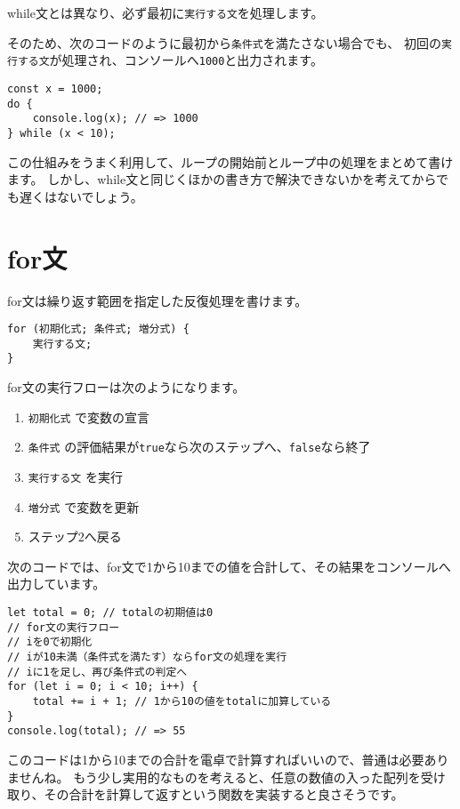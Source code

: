while文とは異なり、必ず最初に\texttt{実行する文}を処理します。

そのため、次のコードのように最初から\texttt{条件式}を満たさない場合でも、
初回の\texttt{実行する文}が処理され、コンソールへ\texttt{1000}と出力されます。

\begin{lstlisting}
const x = 1000;
do {
    console.log(x); // => 1000
} while (x < 10);
\end{lstlisting}

この仕組みをうまく利用して、ループの開始前とループ中の処理をまとめて書けます。
しかし、while文と同じくほかの書き方で解決できないかを考えてからでも遅くはないでしょう。

\hypertarget{for-statement}{%
\section{for文}\label{for-statement}}

for文は繰り返す範囲を指定した反復処理を書けます。

\begin{lstlisting}
for (初期化式; 条件式; 増分式) {
    実行する文;
}
\end{lstlisting}

for文の実行フローは次のようになります。

\begin{enumerate}
\def\labelenumi{\arabic{enumi}.}
\item
  \texttt{初期化式} で変数の宣言
\item
  \texttt{条件式}
  の評価結果が\texttt{true}なら次のステップへ、\texttt{false}なら終了
\item
  \texttt{実行する文} を実行
\item
  \texttt{増分式} で変数を更新
\item
  ステップ2へ戻る
\end{enumerate}

次のコードでは、for文で1から10までの値を合計して、その結果をコンソールへ出力しています。

\begin{lstlisting}
let total = 0; // totalの初期値は0
// for文の実行フロー
// iを0で初期化
// iが10未満（条件式を満たす）ならfor文の処理を実行
// iに1を足し、再び条件式の判定へ
for (let i = 0; i < 10; i++) {
    total += i + 1; // 1から10の値をtotalに加算している
}
console.log(total); // => 55
\end{lstlisting}

このコードは1から10までの合計を電卓で計算すればいいので、普通は必要ありませんね。
もう少し実用的なものを考えると、任意の数値の入った配列を受け取り、その合計を計算して返すという関数を実装すると良さそうです。

